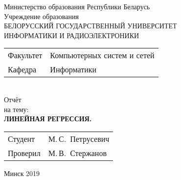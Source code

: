 \begin{titlepage}
  \begin{center}
    Министерство образования Республики Беларусь\\[1em]
    Учреждение образования\\
    БЕЛОРУССКИЙ ГОСУДАРСТВЕННЫЙ УНИВЕРСИТЕТ \\
    ИНФОРМАТИКИ И РАДИОЭЛЕКТРОНИКИ\\[1em]

    \begin{minipage}{\textwidth}
      \begin{flushleft}
        \begin{tabular}{ l l }
          Факультет & Компьютерных систем и сетей\\
          Кафедра   & Информатики
        \end{tabular}
      \end{flushleft}
    \end{minipage}\\[1em]


    {Отчёт}\\
    {на тему:}\\[1em]
    \textbf{\large \MakeUppercase{Линейная регрессия.}}\\[1em]


    \vfill
    \begin{tabular}{ p{}p{} }
      Студент & М.\,С.~Петрусевич \\
      Проверил & М.\,В.~Стержанов \\
    \end{tabular}
    
    \vfill
    {\normalsize Минск 2019}
  \end{center}
\end{titlepage}
